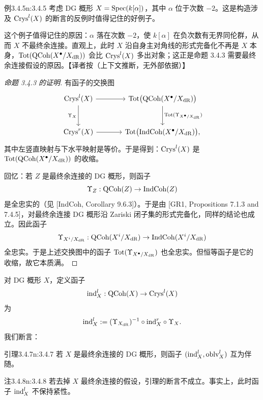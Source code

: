 \begin{othm}{例}{3.4.5}{n:3.4.5}
考虑 DG 概形 $X=\mathrm{Spec}(k[\alpha])$，其中 $\alpha$ 位于次数 $-2$。这是构造涉及 $\mathrm{Crys}^l(X)$ 的断言的反例时值得记住的好例子。
\end{othm}

\begin{annote}
这个例子值得记住的原因：$\alpha$ 落在次数 $-2$，使 $k[\alpha]$ 在负次数有无界同伦群，从而 $X$ 不最终余连接。直观上，此时 $X$ 沿自身主对角线的形式完备化不再是 $X$ 本身，$\mathrm{Tot}(\mathrm{QCoh}(X^\bullet/X_{\mathrm{dR}}))$ 会比 $\mathrm{Crys}^l(X)$ 多出对象；这正是命题 3.4.3 需要最终余连接假设的原因。\hfill【译者按（上下文推断，无外部依据）】
\end{annote}


\begin{proof}[命题 3.4.3 的证明]
有函子的交换图
\[
\begin{tikzcd}[column sep=large, row sep=large]
 \Crys^l(X) \arrow[r] \arrow[d, "\Upsilon_X"'] & \Tot\big(\QCoh(X^\bullet/X_{\dR})\big) \arrow[d, "\Tot(\Upsilon_{X^\bullet/X_{\dR}})"] \\
 \Crys^r(X) \arrow[r] & \Tot\big(\IndCoh(X^\bullet/X_{\dR})\big),
\end{tikzcd}
\]
其中左竖直映射与下水平映射是等价。于是得到：$\mathrm{Crys}^l(X)$ 是 $\mathrm{Tot}(\mathrm{QCoh}(X^\bullet/X_{\mathrm{dR}}))$ 的收缩。

回忆：若 $Z$ 是最终余连接的 DG 概形，则函子
\[
\Upsilon_Z:\mathrm{QCoh}(Z)\to\mathrm{IndCoh}(Z)
\]
是全忠实的（见 [IndCoh, Corollary 9.6.3]）。于是由 [GR1, Propositions 7.1.3 and 7.4.5]，对最终余连接 DG 概形沿 Zariski 闭子集的形式完备化，同样的结论也成立。因此函子
\[
\Upsilon_{X^i/X_{\mathrm{dR}}}:\mathrm{QCoh}(X^i/X_{\mathrm{dR}})\to\mathrm{IndCoh}(X^i/X_{\mathrm{dR}})
\]
全忠实。于是上述交换图中的函子 $\mathrm{Tot}(\Upsilon_{X^\bullet/X_{\mathrm{dR}}})$ 也全忠实。但恒等函子是它的收缩，故它本质满。
\end{proof}

对 DG 概形 $X$，定义函子
\[
\mathrm{ind}^l_X:\mathrm{QCoh}(X)\to\mathrm{Crys}^l(X)
\]
为
\[
\mathrm{ind}^l_X:=(\Upsilon_{X_{\mathrm{dR}}})^{-1}\circ\mathrm{ind}^r_X\circ\Upsilon_X.
\]
我们断言：

\begin{othm}{引理}{3.4.7}{n:3.4.7}
若 $X$ 是最终余连接的 DG 概形，则函子 $(\mathrm{ind}^l_X,\mathrm{oblv}^l_X)$ 互为伴随。
\end{othm}

\begin{othm}{注}{3.4.8}{n:3.4.8}
若去掉 $X$ 最终余连接的假设，引理的断言不成立。事实上，此时函子 $\mathrm{ind}^l_X$ 不保持紧性。
\end{othm}


